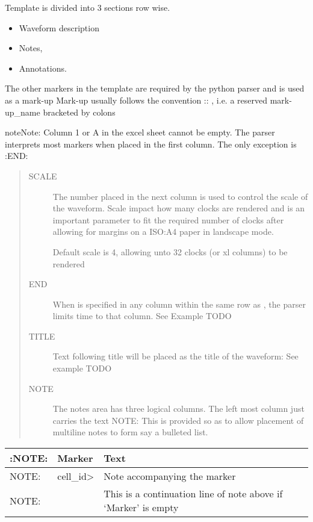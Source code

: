 \documentclass[letterpaper,10pt,english]{sphinxmanual}
\begin{document}
Template is divided into 3 sections row wise.
\begin{itemize}
\item {} 
Waveform description

\item {} 
Notes,

\item {} 
Annotations.

\end{itemize}

The other markers in the template are required by the python parser and is used as a mark-up
Mark-up usually follows the convention :: , i.e. a reserved mark-up\_name bracketed by colons

\begin{sphinxadmonition}{note}{Note:}
Column 1 or A in the excel sheet cannot be empty. The parser interprets
most markers when placed in the first column. The only exception is :END:
\end{sphinxadmonition}
\begin{quote}\begin{description}
\item[{SCALE}] \leavevmode
The number placed in the next column is used to control the scale of the waveform.
Scale impact how many clocks are rendered and is an important parameter
to fit the required number of clocks after allowing for margins on a ISO:A4
paper in landscape mode.

Default scale is 4, allowing unto 32 clocks (or xl columns) to be rendered

\item[{END}] \leavevmode
When  is specified in any column within the same row as , the parser
limits time to that column. See Example TODO

\item[{TITLE}] \leavevmode
Text following title will be placed as the title of the waveform: See example TODO

\item[{NOTE}] \leavevmode
The notes area has three logical columns. The left most column just carries the text NOTE:
This is provided so as to allow placement of multiline notes to form say a bulleted list.

\end{description}\end{quote}


\begin{savenotes}\sphinxattablestart
\centering
\begin{tabulary}{\linewidth}[t]{|T|T|T|}
\hline
\sphinxstyletheadfamily 
:NOTE:
&\sphinxstyletheadfamily 
Marker
&\sphinxstyletheadfamily 
Text
\\
\hline
NOTE:
&
cell\_id\textgreater{}
&
Note accompanying the marker
\\
\hline
NOTE:
&

&
This is a continuation line of note above if ‘Marker’ is empty
\\
\hline
\end{tabulary}
\par
\sphinxattableend\end{savenotes}
\end{document}
